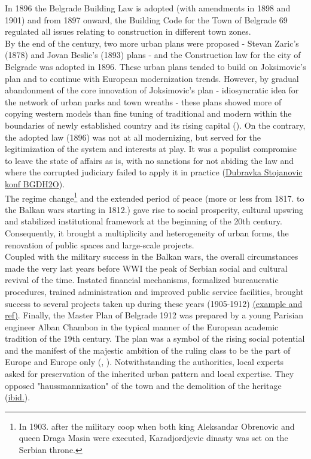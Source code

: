\documentclass[11pt]{report}
\begin{document}
In 1896 the Belgrade Building Law is adopted (with amendments in 1898 and 1901) and from 1897 onward, the Building Code for the Town of Belgrade 69 regulated all issues relating to construction in different town zones.
\\

By the end of the century, two more urban plans were proposed - Stevan Zaric's (1878) and Jovan Beslic's (1893) plans - and the Construction law for the city of Belgrade was adopted in 1896. These urban plans tended to build on Joksimovic's plan and to continue with European modernization trends.
However, by gradual abandonment of the core innovation of Joksimovic's plan - idiosyncratic idea for the network of urban parks and town wreaths - these plans showed more of copying western models than fine tuning of traditional and modern within the boundaries of newly established country and its rising capital (\href{}{\citealt{blagojevic_urban_2009}}). On the contrary, the adopted law (1896) was not at all modernizing, but served for the legitimization of the system and interests at play.
It was a populist compromise to leave the state of affairs as is, with no sanctions for not abiding the law and where the corrupted judiciary failed to apply it in practice (\href{}{Dubravka Stojanovic konf BGDH2O}). 
\\

The regime change\footnote{In 1903. after the military coop when both king Aleksandar Obrenovic and queen Draga Masin were executed, Karadjordjevic dinasty was set on the Serbian throne.}
and the extended period of peace (more or less from 1817. to the Balkan wars starting in 1812.) gave rise to social prosperity, cultural upswing and stabilized institutional framework at the beginning of the 20th century. Consequently, it brought a multiplicity and heterogeneity of urban forms, the renovation of public spaces and large-scale projects.
\\

Coupled with the military success in the Balkan wars, the overall circumstances made the very last years before  WWI the peak of Serbian social and cultural revival of the time.
Instated financial mechanisms, formalized bureaucratic procedures, trained administration and improved public service facilities, brought success to several projects taken up during these years (1905-1912) \href{}{(example and ref)}.
Finally, the Master Plan of  Belgrade 1912 was prepared by a young Parisian engineer Alban Chambon in the typical manner of the European academic tradition of the 19th century.
The plan was a symbol of the rising social potential and the manifest of the majestic ambition of the ruling class to be the part of Europe and Europe only 
(\href{}{\citealt{blagojevic_urban_2009}}, \href{}{\citealt{doytchinov_modernization_2015}}).
Notwithstanding the authorities, local experts asked for preservation of the inherited urban pattern and local expertise. They opposed "haussmannization" of the town and the demolition of the heritage (\href{}{ibid.}).
\\
\end{document}
